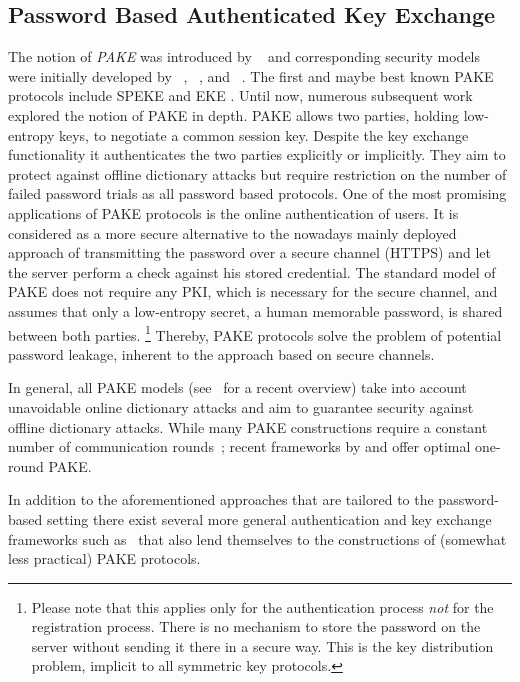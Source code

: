 \subsection{Password Based Authenticated Key Exchange}
The notion of \emph{\ac{PAKE}} was introduced by \citeauthor{bellovin92}~\cite{bellovin92} and corresponding security models were initially developed by \citeauthor{Bellare2000}~\cite{Bellare2000}, \citeauthor{Boyko2000}~\cite{Boyko2000}, and \citeauthor{Goldreich01}~\cite{Goldreich01}.
The first and maybe best known \ac{PAKE} protocols include SPEKE \cite{Jablon96} and EKE \cite{bellovin92,Bellare2000}.
Until now, numerous subsequent work explored the notion of \acl{PAKE} in depth.
\ac{PAKE} allows two parties, holding low-entropy keys, to negotiate a common session key.
Despite the key exchange functionality it authenticates the two parties explicitly or implicitly.
They aim to protect against offline dictionary attacks but require restriction on the number of failed password trials as all password based protocols.
One of the most promising applications of \ac{PAKE} protocols is the online authentication of users.
It is considered as a more secure alternative to the nowadays mainly deployed approach of transmitting the password over a secure channel (\ac{HTTPS}) and let the server perform a check against his stored credential.
The standard model of \ac{PAKE} does not require any \ac{PKI}, which is necessary for the secure channel, and assumes that only a low-entropy secret, \ie a human memorable password, is shared between both parties.
\footnote{Please note that this applies only for the authentication process \emph{not} for the registration process.
There is no mechanism to store the password on the server without sending it there in a secure way.
This is the key distribution problem, implicit to all symmetric key protocols.}
Thereby, \ac{PAKE} protocols solve the problem of potential password leakage, inherent to the approach based on secure channels.

In general, all PAKE models (see~\cite{Pointcheval2012} for a recent overview) take into account unavoidable online dictionary attacks and aim to guarantee security against offline dictionary attacks.
While many PAKE constructions require a constant number of communication rounds~\cite{Gennaro2003,Abdalla2005,Gennaro2008,Katz2009a,Katz2011}; recent frameworks by \citeauthor{Katz2011} \cite{Katz2011} and \citeauthor{Benhamouda2013} \cite{Benhamouda2013} offer optimal one-round PAKE.

In addition to the aforementioned approaches that are tailored to the password-based setting there exist several more general authentication and key exchange frameworks such as~\cite{Camenisch2010,Blazy2012} that also lend themselves to the constructions of (somewhat less practical) PAKE protocols.

